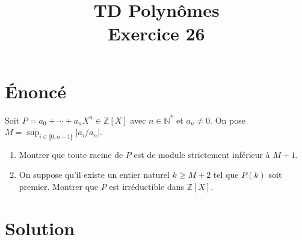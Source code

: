 \documentclass[french]{article}
\title{TD Polynômes \\ Exercice 26}
\date{}
\newcommand{\N}{\mathbb{N}}
\newcommand{\Z}{\mathbb{Z}}
\newcommand{\st}{^*}
\begin{document}
\maketitle

\section{Énoncé}
Soit $P=a_0+\cdots+a_nX^n\in\Z[X]$ avec $n\in\N\st$ et $a_n\ne 0$. On pose $M=\displaystyle\sup_{i\in\llbracket0,n-1\rrbracket}\lvert a_i/a_{n}\rvert$.
\begin{enumerate}
	\item Montrer que toute racine de $P$ est de module strictement inférieur à $M+1$.
	\item On suppose qu'il existe un entier naturel $k\geqslant M+2$ tel que $P(k)$ soit premier. Montrer que $P$ est irréductible dans $\Z[X]$.
\end{enumerate}
\section{Solution}
\end{document}
